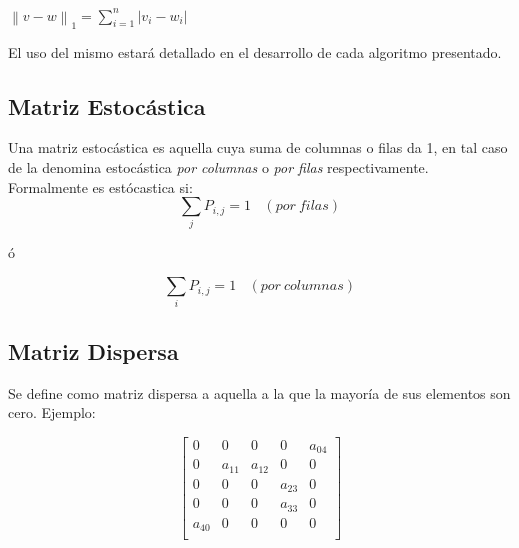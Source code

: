 \begin{center}
$\left \| v - w \right \|_{1} = \sum_{i=1}^{n} \left | v_{i} - w_{i} \right |$
\end{center}

El uso del mismo estará detallado en el desarrollo de cada algoritmo presentado.

\subsection{Matriz Estocástica}
	Una matriz estocástica es aquella cuya suma de columnas o filas da 1, en tal caso de la denomina estocástica \textit{por columnas} o \textit{por filas} respectivamente.
	Formalmente es estócastica si:
	\begin{equation}
	\sum_j P_{i,j}=1 \ \ \ \ (por\ filas)
	\end{equation}
	\begin{center}ó\end{center}
		\begin{equation}
	 \sum_i P_{i,j}=1 \ \ \ \ (por\ columnas)
	\end{equation}
	

\subsection{Matriz Dispersa}
   Se define como matriz dispersa a aquella a la que la mayoría de sus elementos son cero.
   Ejemplo:

   $$ 
\begin{bmatrix}
       0    &      0    &   0       &   0           &   a_{04}    \\
       0    &   a_{11}  &   a_{12}  &   0           &   0    \\
       0    &      0    &   0       &   a_{23}      &   0    \\
       0    &      0    &   0       &   a_{33}      &   0    \\
  a_{40}    &      0    &   0       &   0           &   0    \\
\end{bmatrix} 
$$


